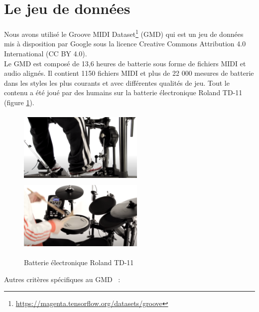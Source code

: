 \section{Le jeu de données}
\label{gmd}
Nous avons utilisé le Groove MIDI
Dataset\footnote{\url{https://magenta.tensorflow.org/datasets/groove}}
\cite{groove2019} (GMD) qui est un jeu de données mis à disposition par Google
sous la licence Creative Commons Attribution 4.0 International (CC BY 4.0).\\
Le GMD est composé de 13,6 heures de batterie sous forme de fichiers MIDI et
audio alignés. Il contient 1150 fichiers MIDI et plus de 22 000 mesures de
batterie dans les styles les plus courants et avec différentes qualités de jeu.
Tout le contenu a été joué par des humains sur la batterie électronique Roland
TD-11 (figure \ref{electro_drums}).
\begin{figure}[h]
	\centering
	\includegraphics[height=35mm, width=60mm]
    {z_images/4_experimentations/0_groove/0_roland.png}\ \ 
	\includegraphics[height=35mm, width=60mm]
    {z_images/4_experimentations/0_groove/1_roland.png}
	\caption[Batterie électronique Roland TD-11]{Batterie électronique Roland
TD-11\footnotemark}
	\label{electro_drums}
	
\end{figure}
Autres critères spécifiques au GMD~ :
